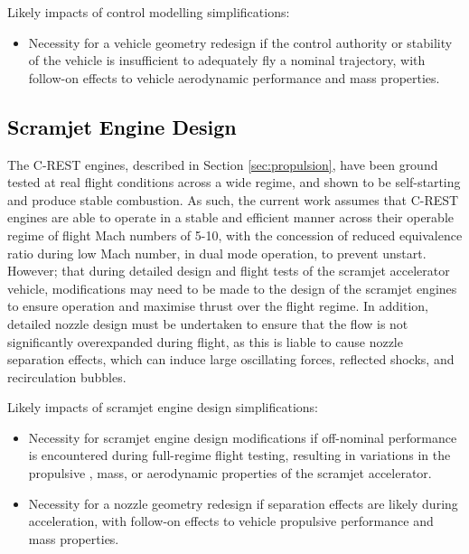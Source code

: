 Likely impacts of control modelling simplifications:
\begin{itemize}[noitemsep,topsep=0pt]
	\item Necessity for a vehicle geometry redesign if the control authority or stability of the vehicle is insufficient to adequately fly a nominal trajectory, with follow-on effects to vehicle aerodynamic performance and mass properties.
\end{itemize}
	\textcolor{black}{
		\subsection{Scramjet Engine Design}
	}
	\noindent	
	The C-REST engines, described in Section \ref{sec:propulsion}, have been ground tested at real flight conditions across a wide regime, and shown to be self-starting and produce stable combustion\cite{Smart2012,Whitside,Turner,Barth,Curran}. As such, the current work assumes that C-REST engines are able to operate in a stable and efficient manner across their operable regime of flight Mach numbers of 5-10, with the concession of reduced equivalence ratio during low Mach number, in dual mode operation, to prevent unstart. 
	 However; that during detailed design and flight tests of the scramjet accelerator vehicle, modifications may need to be made to the design of the scramjet engines to ensure operation and maximise thrust over the flight regime. In addition, detailed nozzle design must be undertaken to ensure that the flow is not significantly overexpanded during flight, as this is liable to cause nozzle separation effects, which can induce large oscillating forces, reflected shocks, and recirculation bubbles\cite{Hadjaj2009}. 
	 
	Likely impacts of scramjet engine design simplifications:
	\begin{itemize}[noitemsep,topsep=0pt]
		\item Necessity for scramjet engine design modifications if off-nominal performance is encountered during full-regime flight testing, resulting in variations in the propulsive , mass, or aerodynamic properties of the scramjet accelerator. 
		\item Necessity for a nozzle geometry redesign if separation effects are likely during acceleration, with follow-on effects to vehicle propulsive performance and mass properties.
	\end{itemize}

